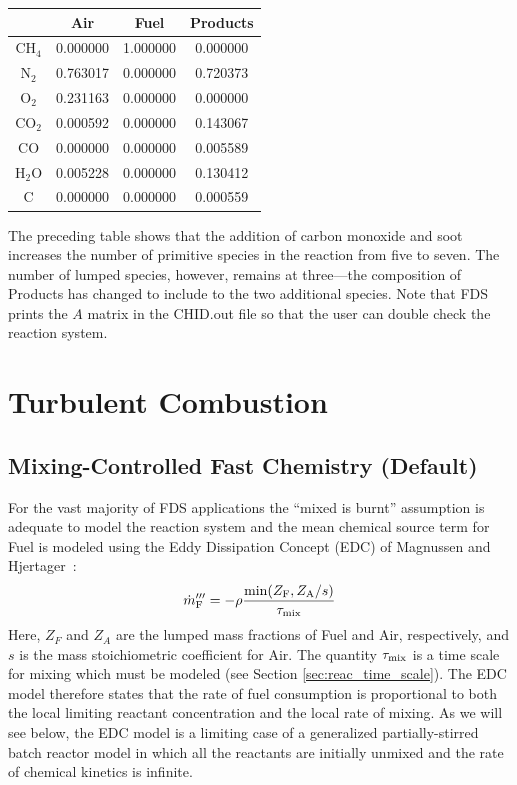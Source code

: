 \begin{center}
\begin{tabular}{c c c c }
                   & Air & Fuel & Products \\ \hline
{CH$_4$}           & 0.000000 & 1.000000 & 0.000000 \\
{N$_2$}            & 0.763017 & 0.000000 & 0.720373 \\
{O$_2$}            & 0.231163 & 0.000000 & 0.000000 \\
{CO$_2$}           & 0.000592 & 0.000000 & 0.143067 \\
{CO}               & 0.000000 & 0.000000 & 0.005589 \\
{H$_2$O}           & 0.005228 & 0.000000 & 0.130412 \\
{C}                & 0.000000 & 0.000000 & 0.000559 \\
\end{tabular}
\end{center}

\noindent The preceding table shows that the addition of carbon monoxide and soot increases the number of primitive species in the reaction from five to seven. The number of lumped species, however, remains at three---the composition of Products has changed to include to the two additional species.  Note that FDS prints the $A$ matrix in the {\ct CHID.out} file so that the user can double check the reaction system.


\clearpage

\section{Turbulent Combustion}

\subsection{Mixing-Controlled Fast Chemistry (Default)}
\label{sec:fastchemistry}

For the vast majority of FDS applications the ``mixed is burnt'' assumption is adequate to model the reaction system and the mean chemical source term for Fuel is modeled using the Eddy Dissipation Concept (EDC) of Magnussen and Hjertager~\cite{Magnussen:1,Poinsot:TNC}:
\begin{equation}
\label{eq:edc}
\dot{m}_{\si{F}}^{\prime\prime\prime} = -\rho \frac{\min(Z_{\si{F}}, Z_{\si{A}}/s)}{\tau_{\rm mix}}
\end{equation}
Here, $Z_{\si{F}}$ and $Z_{\si{A}}$ are the lumped mass fractions of Fuel and Air, respectively, and $s$ is the mass stoichiometric coefficient for Air.  The quantity $\tau_{\rm mix}$ is a time scale for mixing which must be modeled (see Section \ref{sec:reac_time_scale}).  The EDC model therefore states that the rate of fuel consumption is proportional to both the local limiting reactant concentration and the local rate of mixing. As we will see below, the EDC model is a limiting case of a generalized partially-stirred batch reactor model in which all the reactants are initially unmixed and the rate of chemical kinetics is infinite.


